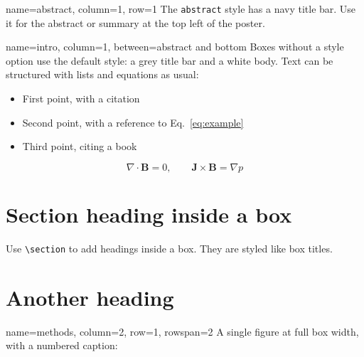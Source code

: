 \documentclass[
	fontsize=26pt,%
	paperwidth=48in,%
	paperheight=36in,%
]{stellarex-poster}
\begin{document}
\begin{tcbposter}[
	poster={
		columns=4,%
		rows=4,%
	}]

\begin{posterboxenv}[
	title=Abstract,
	abstract,%
	]{name=abstract, column=1, row=1}
	The \texttt{abstract} style has a navy title bar. Use it for the abstract or summary at the top left of the poster.

	\lipsum[1][1-4]
\end{posterboxenv}

\begin{posterboxenv}[title=Introduction]{name=intro, column=1, between=abstract and bottom}
	Boxes without a style option use the default style: a grey title bar and a white body.
	Text can be structured with lists and equations as usual:
	\begin{itemize}
		\item First point, with a citation~\cite{placeholder-article}
		\item Second point, with a reference to Eq.~\eqref{eq:example}
		\item Third point, citing a book~\cite{placeholder-book}
	\end{itemize}
	\begin{equation}
		\label{eq:example}
		\nabla \cdot \mathbf{B} = 0, \qquad \mathbf{J} \times \mathbf{B} = \nabla p
	\end{equation}
	\lipsum[2][1-3]

	\section{Section heading inside a box}
	Use \verb+\section+ to add headings inside a box. They are styled like box titles.

	\lipsum[3][1-4]

	\section{Another heading}
	\lipsum[4][1-4]
\end{posterboxenv}

\begin{posterboxenv}[title=Methods]{name=methods, column=2, row=1, rowspan=2}
	A single figure at full box width, with a numbered caption:


\end{posterboxenv}
\end{tcbposter}
\end{document}

